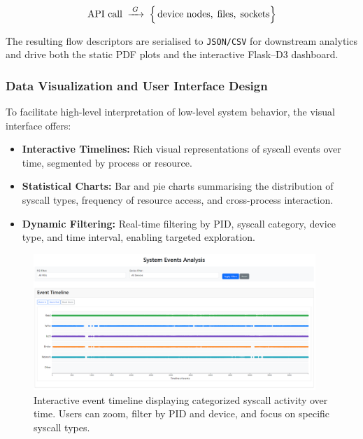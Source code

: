 \documentclass[a4paper,12pt]{report}
\begin{document}
\[
  \text{API call} \;\xrightarrow{\;G\;}\;
  \Bigl\{\,
     \text{device nodes},\;
     \text{files},\;
     \text{sockets}
  \Bigr\}
\]

\noindent
The resulting flow descriptors are serialised to
\texttt{JSON/CSV} for downstream analytics and drive both the static
PDF plots and the interactive Flask–D3 dashboard.


\subsubsection{Data Visualization and User Interface Design}

To facilitate high-level interpretation of low-level system behavior, the visual interface offers:

\begin{itemize}
  \item \textbf{Interactive Timelines:} Rich visual representations of syscall events over time, segmented by process or resource.
  \item \textbf{Statistical Charts:} Bar and pie charts summarising the distribution of syscall types, frequency of resource access, and cross-process interaction.
  \item \textbf{Dynamic Filtering:} Real-time filtering by PID, syscall category, device type, and time interval, enabling targeted exploration.
\end{itemize}

\begin{figure}[H]
\centering
\includegraphics[width=0.95\textwidth]{system_events_timeline.png}
\caption{Interactive event timeline displaying categorized syscall activity over time. Users can zoom, filter by PID and device, and focus on specific syscall types.}
\label{fig:event_timeline}
\end{figure}
\end{document}
